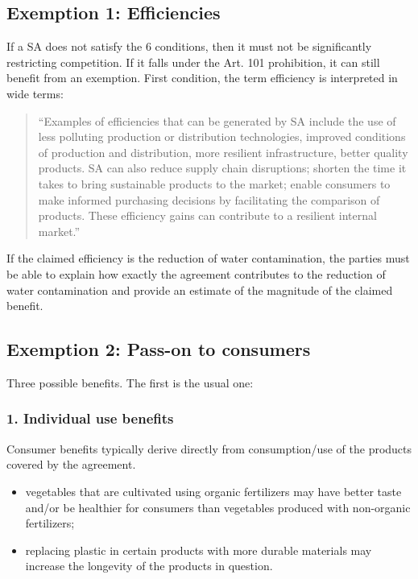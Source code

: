     \subsection{Exemption 1: Efficiencies}

        If a SA does not satisfy the 6 conditions, then it must not be significantly restricting competition. If it falls under the Art. 101 prohibition, it can still benefit from an exemption.  
        First condition, the term efficiency is interpreted in wide terms:  
        \begin{quote}
            ``Examples of efficiencies that can be generated by SA include the use of less polluting production or distribution technologies, improved conditions of production and distribution, more resilient infrastructure, better quality products. SA can also reduce supply chain disruptions; shorten the time it takes to bring sustainable products to the market; enable consumers to make informed purchasing decisions by facilitating the comparison of products. These efficiency gains can contribute to a resilient internal market.''
        \end{quote}

        
        If the claimed efficiency is the reduction of water contamination, the parties must be able to explain how exactly the agreement contributes to the reduction of water contamination and provide an estimate of the magnitude of the claimed benefit.

    \subsection{Exemption 2: Pass-on to consumers}

        Three possible benefits. The first is the usual one:

        \subsubsection{1. Individual use benefits}

            Consumer benefits typically derive directly from consumption/use of the products covered by the agreement.
            \begin{itemize}
                \item vegetables that are cultivated using organic fertilizers may have better taste and/or be healthier for consumers than vegetables produced with non-organic fertilizers;
                \item replacing plastic in certain products with more durable materials may increase the longevity of the products in question.
            \end{itemize}
            
